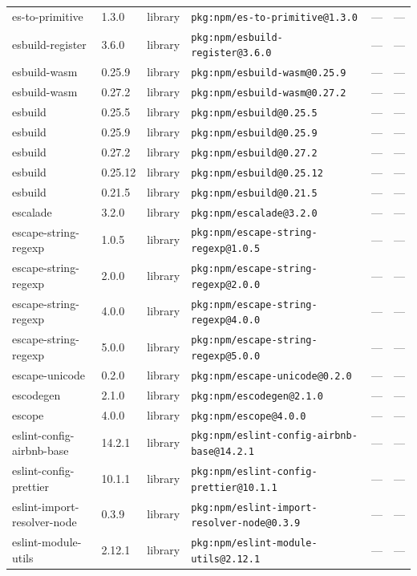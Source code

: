 \documentclass[11pt]{article}
\begin{document}
\begin{longtable}{|l|l|l|p{2.2cm}|l|p{4cm}|}
es-to-primitive & 1.3.0 & library & \texttt{pkg:npm/es-to-primitive@1.3.0} & — & — \\
esbuild-register & 3.6.0 & library & \texttt{pkg:npm/esbuild-register@3.6.0} & — & — \\
esbuild-wasm & 0.25.9 & library & \texttt{pkg:npm/esbuild-wasm@0.25.9} & — & — \\
esbuild-wasm & 0.27.2 & library & \texttt{pkg:npm/esbuild-wasm@0.27.2} & — & — \\
esbuild & 0.25.5 & library & \texttt{pkg:npm/esbuild@0.25.5} & — & — \\
esbuild & 0.25.9 & library & \texttt{pkg:npm/esbuild@0.25.9} & — & — \\
esbuild & 0.27.2 & library & \texttt{pkg:npm/esbuild@0.27.2} & — & — \\
esbuild & 0.25.12 & library & \texttt{pkg:npm/esbuild@0.25.12} & — & — \\
esbuild & 0.21.5 & library & \texttt{pkg:npm/esbuild@0.21.5} & — & — \\
escalade & 3.2.0 & library & \texttt{pkg:npm/escalade@3.2.0} & — & — \\
escape-string-regexp & 1.0.5 & library & \texttt{pkg:npm/escape-string-regexp@1.0.5} & — & — \\
escape-string-regexp & 2.0.0 & library & \texttt{pkg:npm/escape-string-regexp@2.0.0} & — & — \\
escape-string-regexp & 4.0.0 & library & \texttt{pkg:npm/escape-string-regexp@4.0.0} & — & — \\
escape-string-regexp & 5.0.0 & library & \texttt{pkg:npm/escape-string-regexp@5.0.0} & — & — \\
escape-unicode & 0.2.0 & library & \texttt{pkg:npm/escape-unicode@0.2.0} & — & — \\
escodegen & 2.1.0 & library & \texttt{pkg:npm/escodegen@2.1.0} & — & — \\
escope & 4.0.0 & library & \texttt{pkg:npm/escope@4.0.0} & — & — \\
eslint-config-airbnb-base & 14.2.1 & library & \texttt{pkg:npm/eslint-config-airbnb-base@14.2.1} & — & — \\
eslint-config-prettier & 10.1.1 & library & \texttt{pkg:npm/eslint-config-prettier@10.1.1} & — & — \\
eslint-import-resolver-node & 0.3.9 & library & \texttt{pkg:npm/eslint-import-resolver-node@0.3.9} & — & — \\
eslint-module-utils & 2.12.1 & library & \texttt{pkg:npm/eslint-module-utils@2.12.1} & — & — \\

\end{longtable}
\end{document}
